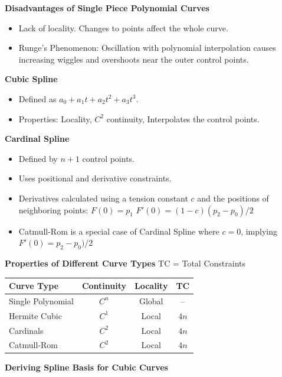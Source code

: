 \documentclass[letterpaper, 8pt]{extarticle}
\begin{document}
\begin{multicols*}{4}
    \textbf{Disadvantages of Single Piece Polynomial Curves}
    \begin{itemize}
        \item Lack of locality. Changes to points affect the whole curve.
        \item Runge's Phenomenon: Oscillation with polynomial interpolation causes increasing wiggles and overshoots near the outer control points.
    \end{itemize}


    \textbf{Cubic Spline}
    \begin{itemize}
        \item Defined as $a_0 + a_1t + a_2t^2 + a_3t^3$.
        \item Properties: Locality, $C^2$ continuity, Interpolates the control points.
    \end{itemize}

    \textbf{Cardinal Spline}
    \begin{itemize}
        \item Defined by $n+1$ control points.
        \item Uses positional and derivative constraints.
        \item Derivatives calculated using a tension constant $c$ and the positions of neighboring points: $F(0) = p_1$ $F'(0) = (1-c)(p_2 - p_0)/2$
        \item Catmull-Rom is a special case of Cardinal Spline where $c = 0$, implying $ F'(0) = p_2 - p_0)/2$
    \end{itemize}

    \textbf{Properties of Different Curve Types}
    TC = Total Constraints
    \begin{center}
        \begin{tabular}{|l|c|c|c|}
            \hline
            Curve Type        & Continuity & Locality & TC   \\
            \hline
            Single Polynomial & $C^n$      & Global   & --   \\
            Hermite Cubic     & $C^1$      & Local    & $4n$ \\
            Cardinals         & $C^2$      & Local    & $4n$ \\
            Catmull-Rom       & $C^2$      & Local    & $4n$ \\
            \hline
        \end{tabular}
    \end{center}

    \textbf{Deriving Spline Basis for Cubic Curves}


\end{multicols*}
\end{document}
